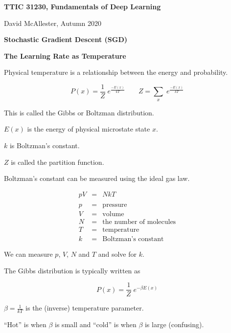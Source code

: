 


\newcommand{\solution}[1]{\bigskip {\bf Solution}: #1}



{\Huge
  \centerline{\bf TTIC 31230, Fundamentals of Deep Learning}
  \bigskip
  \centerline{David McAllester, Autumn 2020}
  \vfill
  \centerline{\bf Stochastic Gradient Descent (SGD)}
  \vfill
  \centerline{\bf The Learning Rate as Temperature}


Physical temperature is a relationship between the energy and probability.

\vfill
$$P(x) = \frac{1}{Z} \;e^{\frac{-E(x)}{kT}} \;\;\;\;\;\;\;Z = \sum_x\; e^{\frac{-E(x)}{kT}}$$

\vfill
This is called the Gibbs or Boltzman distribution.

\vfill
$E(x)$ is the energy of physical microstate state $x$.


\vfill
$k$ is Boltzman's constant.

\vfill
$Z$ is called the partition function.


Boltzman's constant can be measured using the ideal gas law.

\begin{eqnarray*}
pV & = & NkT \\
\\
p & = & \mathrm{pressure} \\
V & = & \mathrm{volume} \\
N & = & \mbox{the number of molecules} \\
T & = & \mathrm{temperature} \\
k & = & \mbox{Boltzman's constant}
\end{eqnarray*}

\vfill
We can measure $p$, $V$, $N$ and $T$ and solve for $k$.



The Gibbs distribution is typically written as

$$P(x) = \frac{1}{Z}\;e^{-\beta E(x)}$$

\vfill

$\beta = \frac{1}{kT}$ is the (inverse) temperature parameter.

\vfill
``Hot'' is when $\beta$ is small and ``cold'' is when $\beta$ is large (confusing).


}
